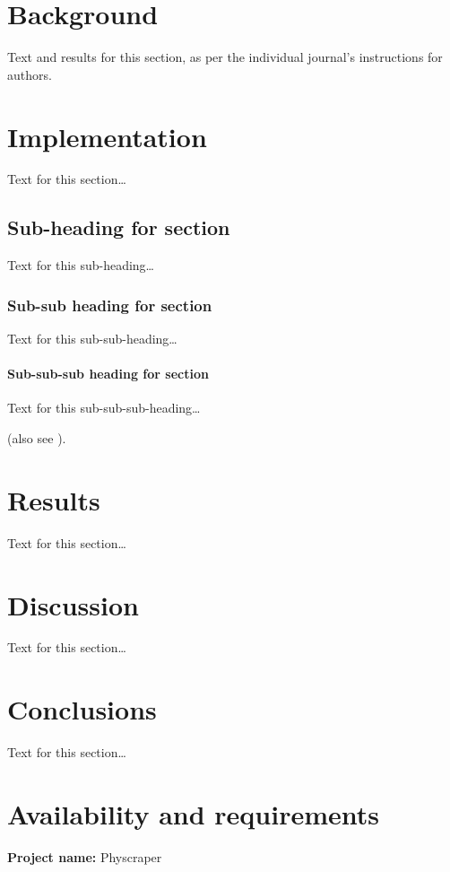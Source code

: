 \documentclass{bmcart}
\begin{document}

\section*{Background}
Text and results for this section, as per the individual journal's instructions for authors.

\section*{Implementation}
Text for this section\ldots
\subsection*{Sub-heading for section}
Text for this sub-heading\ldots
\subsubsection*{Sub-sub heading for section}
Text for this sub-sub-heading\ldots
\paragraph*{Sub-sub-sub heading for section}
Text for this sub-sub-sub-heading\ldots



(also see \cite{koon,xjon,marg,schn,koha,issnic}).


\section*{Results}
Text for this section\ldots

\section*{Discussion}
Text for this section\ldots

\section*{Conclusions}
Text for this section\ldots

\section*{Availability and requirements}

\textbf{Project name:} Physcraper
\end{document}
